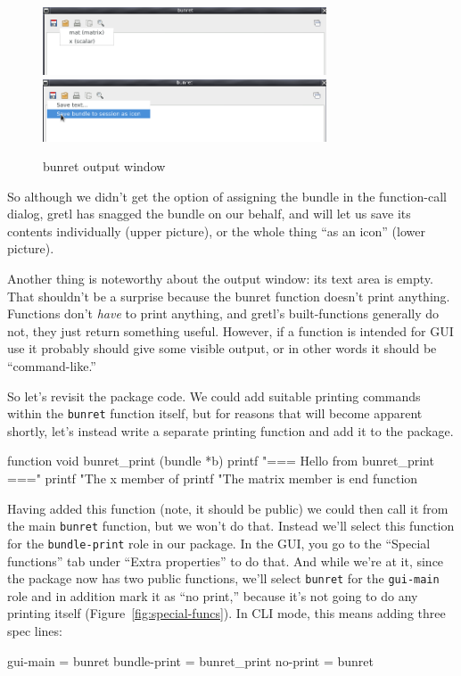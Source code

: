 \documentclass[oneside]{book}
\begin{document}
\begin{figure}[htbp]
\begin{center}
  \includegraphics[width=0.75\textwidth]{figures/bunret-window1} \\
 \vspace{2ex}
  \includegraphics[width=0.75\textwidth]{figures/bunret-window2}
\end{center}
\caption{bunret output window}
\label{fig:bunret-window}
\end{figure}

So although we didn't get the option of assigning the bundle in the
function-call dialog, gretl has snagged the bundle on our behalf, and
will let us save its contents individually (upper picture), or the
whole thing ``as an icon'' (lower picture).

Another thing is noteworthy about the output window: its text area is
empty. That shouldn't be a surprise because the bunret function
doesn't print anything. Functions don't \textit{have} to print
anything, and gretl's built-functions generally do not, they just
return something useful. However, if a function is intended for GUI
use it probably should give some visible output, or in other words it
should be ``command-like.''

So let's revisit the package code. We could add suitable printing
commands within the \texttt{bunret} function itself, but for reasons
that will become apparent shortly, let's instead write a separate
printing function and add it to the package.
%
\begin{code}
function void bunret_print (bundle *b)
  printf "=== Hello from bunret_print ===\n\n"
  printf "The x member of %
  printf "The matrix member is\n\n%
end function
\end{code}
%
Having added this function (note, it should be public) we could then
call it from the main \texttt{bunret} function, but we won't do
that. Instead we'll select this function for the \texttt{bundle-print}
role in our package. In the GUI, you go to the ``Special functions''
tab under ``Extra properties'' to do that. And while we're at it,
since the package now has two public functions, we'll select
\texttt{bunret} for the \texttt{gui-main} role and in addition mark it
as ``no print,'' because it's not going to do any printing itself
(Figure~\ref{fig:special-funcs}).  In CLI mode, this means adding
three \textsf{spec} lines:
%
\begin{code}
gui-main = bunret
bundle-print = bunret_print
no-print = bunret
\end{code}
\end{document}
